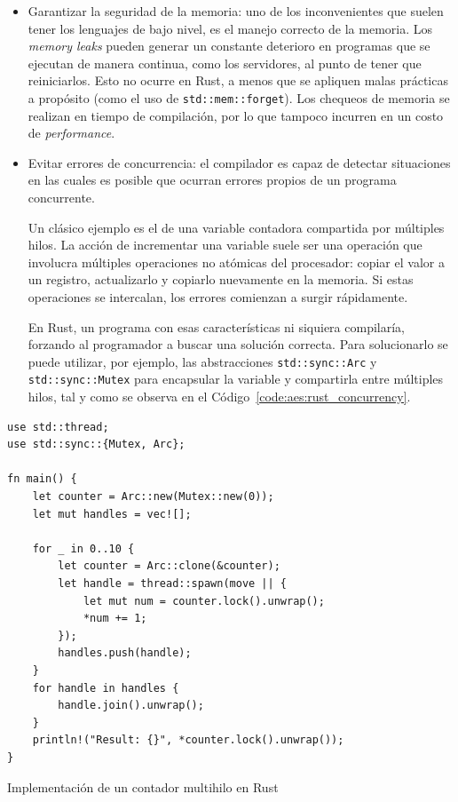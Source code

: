 \documentclass[11pt]{article}
\newcommand{\english}[1]{\textit{#1}}
\begin{document}
\begin{itemize}
    \item Garantizar la seguridad de la memoria: uno de los inconvenientes que suelen tener los lenguajes de bajo nivel, es el manejo correcto de la memoria. Los \english{memory leaks} pueden generar un constante deterioro en programas que se ejecutan de manera continua, como los servidores, al punto de tener que reiniciarlos. Esto no ocurre en Rust, a menos que se apliquen malas prácticas a propósito (como el uso de \lstinline{std::mem::forget}). Los chequeos de memoria se realizan en tiempo de compilación, por lo que tampoco incurren en un costo de \english{performance}.
    \item Evitar errores de concurrencia: el compilador es capaz de detectar situaciones en las cuales es posible que ocurran errores propios de un programa concurrente.
    
    Un clásico ejemplo es el de una variable contadora compartida por múltiples hilos. La acción de incrementar una variable suele ser una operación que involucra múltiples operaciones no atómicas del procesador: copiar el valor a un registro, actualizarlo y copiarlo nuevamente en la memoria. Si estas operaciones se intercalan, los errores comienzan a surgir rápidamente.
    
    En Rust, un programa con esas características ni siquiera compilaría, forzando al programador a buscar una solución correcta. Para solucionarlo se puede utilizar, por ejemplo, las abstracciones \lstinline{std::sync::Arc} y \lstinline{std::sync::Mutex} para encapsular la variable y compartirla entre múltiples hilos, tal y como se observa en el Código~\ref{code:aes:rust_concurrency}.
\end{itemize}

\begin{listing}[h]
\begin{verbatim}
use std::thread;
use std::sync::{Mutex, Arc};

fn main() {
    let counter = Arc::new(Mutex::new(0));
    let mut handles = vec![];

    for _ in 0..10 {
        let counter = Arc::clone(&counter);
        let handle = thread::spawn(move || {
            let mut num = counter.lock().unwrap();
            *num += 1;
        });
        handles.push(handle);
    }
    for handle in handles {
        handle.join().unwrap();
    }
    println!("Result: {}", *counter.lock().unwrap());
}
\end{verbatim}
\caption{Implementación de un contador multihilo en Rust}
\label{code:aes:rust_concurrency}
\end{listing}
\end{document}
